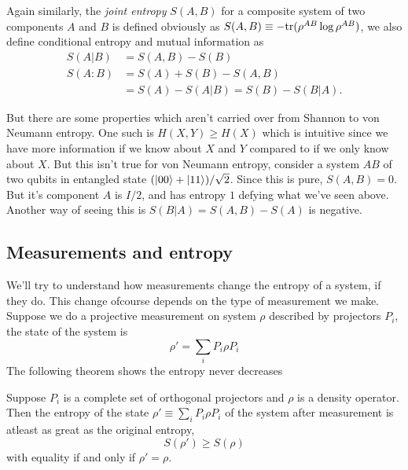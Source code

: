 Again similarly, the \textit{joint entropy} $S(A, B)$ for a composite system of two components $A$ and $B$ is defined obviously as $S(A, B) \equiv -\text{tr}(\rho^{AB}\log{\rho^{AB}})$, we also define conditional entropy and mutual information as
\begin{align}
    S(A|B) &= S(A,B) - S(B) \\
    S(A:B) &= S(A) + S(B) - S(A, B) \\
    &= S(A)-S(A|B) = S(B) - S(B|A). 
\end{align}

But there are some properties which aren't carried over from Shannon to von Neumann entropy. One such is $H(X,Y)\geq H(X)$ which is intuitive since we have more information if we know about $X$ and $Y$ compared to if we only know about $X$. But this isn't true for von Neumann entropy, consider a system $AB$ of two qubits in entangled state $(\ket{00}+\ket{11})/\sqrt{2}$. Since this is pure, $S(A, B)=0$. But it's component $A$ is $I/2$, and has entropy $1$ defying what we've seen above. Another way of seeing this is $S(B|A) = S(A, B) - S(A)$ is negative.

\subsection{Measurements and entropy}
We'll try to understand how measurements change the entropy of a system, if they do. This change ofcourse depends on the type of measurement we make. Suppose we do a projective measurement on system $\rho$ described by projectors $P_i$, the state of the system is
\begin{equation}
    \rho' = \sum_i P_i\rho P_i
\end{equation}
The following theorem shows the entropy never decreases
\begin{theorem}
    Suppose $P_i$ is a complete set of orthogonal projectors and $\rho$ is a density operator. Then the entropy of the state $\rho' \equiv \sum_iP_i\rho P_i$ of the system after measurement is atleast as great as the original entropy,
    \begin{equation}
        S(\rho') \geq S(\rho)
    \end{equation}
    with equality if and only if $\rho' = \rho$.
\end{theorem}


